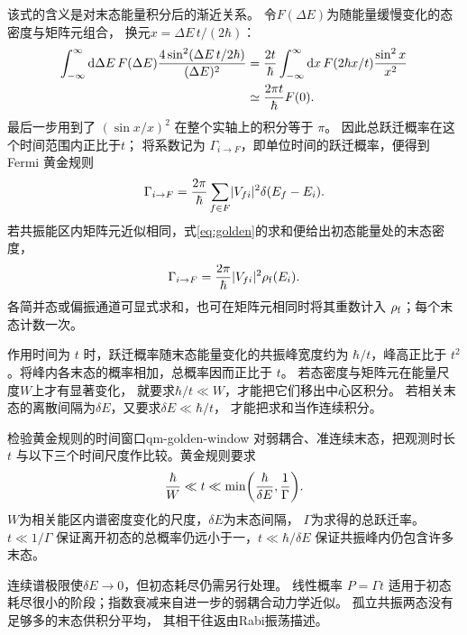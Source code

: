 该式的含义是对末态能量积分后的渐近关系。
令$F(\Delta E)$为随能量缓慢变化的态密度与矩阵元组合，
换元$x = \Delta E\,t/(2\hbar)$：
\begin{equation}
    \begin{alignedat}{1}
        \int_{-\infty}^\infty\mathop{}\!\mathrm{d}\Delta E\,
        F(\Delta E)\frac{4\sin^2(\Delta E\,t/2\hbar)}{(\Delta E)^2} &= \frac{2t}{\hbar}\int_{-\infty}^\infty\mathop{}\!\mathrm{d} x\,
            F(2\hbar x/t)\frac{\sin^2x}{x^2}\\
        &\simeq \frac{2\pi t}{\hbar}F(0).
    \end{alignedat}
\end{equation}
最后一步用到了 $(\sin x/x)^2$ 在整个实轴上的积分等于 $\pi$。
因此总跃迁概率在这个时间范围内正比于$t$；
将系数记为 $\Gamma_{i\to F}$，即单位时间的跃迁概率，便得到 Fermi 黄金规则
\begin{equation}
    \Gamma_{i\to F} = \frac{2\pi}{\hbar}
    \sum_{f\in F}\lvert V_{fi}\rvert^2\delta(E_f - E_i).
    \label{eq:golden}
\end{equation}
若共振能区内矩阵元近似相同，式\eqref{eq:golden}的求和便给出初态能量处的末态密度，
\begin{equation}
    \Gamma_{i\to F} = \frac{2\pi}{\hbar}\lvert V_{fi}\rvert^2\rho_\mathrm f(E_i).
\end{equation}
各简并态或偏振通道可显式求和，也可在矩阵元相同时将其重数计入 $\rho_\mathrm f$；每个末态计数一次。

作用时间为 $t$ 时，跃迁概率随末态能量变化的共振峰宽度约为 $\hbar/t$，峰高正比于 $t^2$。将峰内各末态的概率相加，总概率因而正比于 $t$。
若态密度与矩阵元在能量尺度$W$上才有显著变化，
就要求$\hbar/t \ll W$，才能把它们移出中心区积分。
若相关末态的离散间隔为$\delta E$，又要求$\delta E \ll \hbar/t$，
才能把求和当作连续积分。

\begin{method}{检验黄金规则的时间窗口}{qm-golden-window}
    \label{dfn:qm-golden-window}
    对弱耦合、准连续末态，把观测时长 $t$ 与以下三个时间尺度作比较。黄金规则要求
    \begin{equation}
        \frac{\hbar}{W} \ll t \ll
        \min\biggl(\frac{\hbar}{\delta E},\frac1\Gamma\biggr).
    \end{equation}
    $W$为相关能区内谱密度变化的尺度，$\delta E$为末态间隔，
    $\Gamma$为求得的总跃迁率。
    $t \ll 1/\Gamma$ 保证离开初态的总概率仍远小于一，$t \ll \hbar/\delta E$ 保证共振峰内仍包含许多末态。
\end{method}

连续谱极限使$\delta E \to 0$，但初态耗尽仍需另行处理。
线性概率 $P = \Gamma t$ 适用于初态耗尽很小的阶段；指数衰减来自进一步的弱耦合动力学近似。
孤立共振两态没有足够多的末态供积分平均，
其相干往返由Rabi振荡描述。

